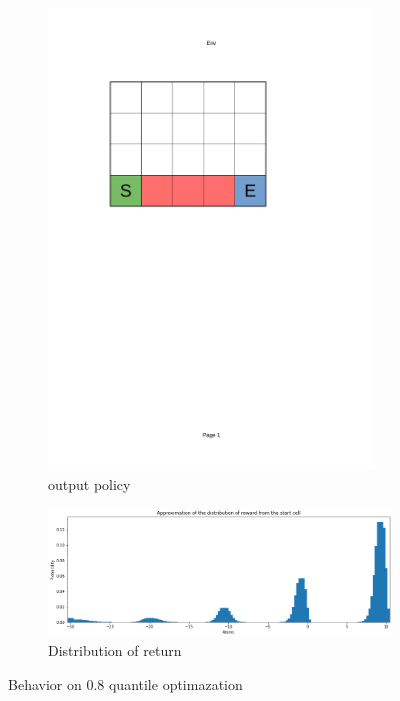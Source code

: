 \begin{figure}[!ht]
    \centering
    \begin{subfigure}{0.25\textwidth}
        \centering
            \includegraphics[page=7, trim = 40mm 160mm 70mm 45mm, clip, width=0.95\textwidth]{figures/personal_work/policies.pdf}
        \caption{output policy}
    \end{subfigure}
    \hfill
    \begin{subfigure}{0.70\textwidth}
        \centering
            \includegraphics[width=\textwidth]{figures/personal_work/distrib_q80.png}
        \caption{Distribution of return}
    \end{subfigure}
        \caption{Behavior on 0.8 quantile optimazation}
\end{figure}

